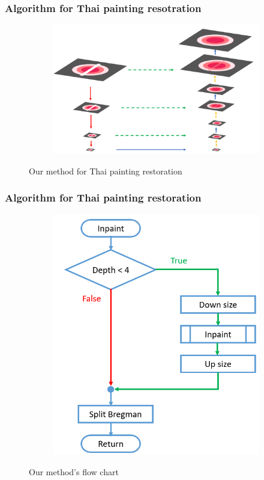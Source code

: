 \documentclass[xcolor=dvipsnames, xetex,serif]{beamer}
\begin{document}
    \begin{frame}
		\frametitle{Algorithm for Thai painting resotration}
		\begin{figure}[H]
			\centering
			\begin{subfigure}{0.7\linewidth}
				\centering
				\includegraphics[width=1\linewidth]{images/method_thaiart/step_thaiart.png}
			\end{subfigure}
			\caption{Our method for Thai painting restoration}
        \end{figure}
	\end{frame}
	\begin{frame}
		\frametitle{Algorithm for Thai painting restoration}
		\begin{figure}[H]
			\centering
			\begin{subfigure}{0.5\linewidth}
				\centering
				\includegraphics[width=1\linewidth]{images/method_thaiart/flowchart_thaiart.png}
			\end{subfigure}
			\caption{Our method's flow chart}
		\end{figure}
	\end{frame}
\end{document}
